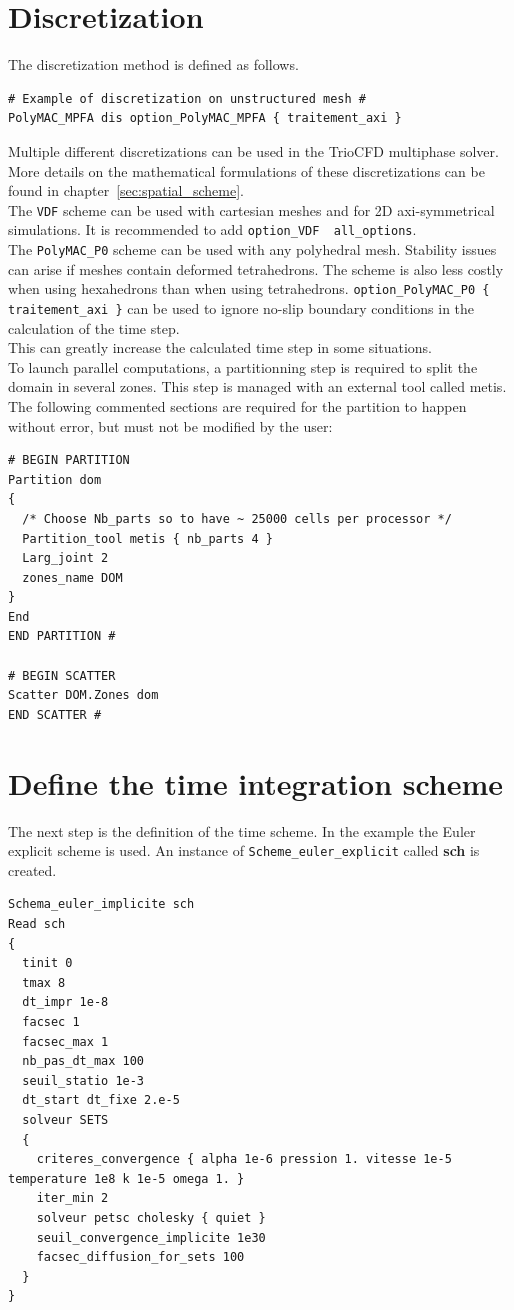 \section{Discretization}\label{data:discretisation}
The discretization method is defined as follows.
\begin{lstlisting}
# Example of discretization on unstructured mesh #
PolyMAC_MPFA dis option_PolyMAC_MPFA { traitement_axi }
\end{lstlisting}
Multiple different discretizations can be used in the TrioCFD multiphase solver.
More details on the mathematical formulations of these discretizations can be found in chapter~\ref{sec:spatial_scheme}.\\
The \texttt{VDF} scheme can be used with cartesian meshes and for 2D axi-symmetrical simulations. 
It is recommended to add \texttt{option\_VDF { all_options}}.\\
The \texttt{PolyMAC\_P0} scheme can be used with any polyhedral mesh.
Stability issues can arise if meshes contain deformed tetrahedrons. The scheme is also less costly when using hexahedrons than when using tetrahedrons.
\texttt{option\_PolyMAC\_P0 \{ traitement\_axi \}} can be used to ignore no-slip boundary conditions in the calculation of the time step. \\
This can greatly increase the calculated time step in some situations.\\
To launch parallel computations, a partitionning step is required to split the domain in several zones. 
This step is managed with an external tool called metis.\\
The following commented sections are required for the partition to happen without error, but must not be modified by the user:
\begin{lstlisting}
# BEGIN PARTITION
Partition dom
{
  /* Choose Nb_parts so to have ~ 25000 cells per processor */
  Partition_tool metis { nb_parts 4 }
  Larg_joint 2
  zones_name DOM
}
End
END PARTITION #

# BEGIN SCATTER
Scatter DOM.Zones dom
END SCATTER #
\end{lstlisting}

\section{Define the time integration scheme}\label{data:time}
The next step is the definition of the time scheme. In the example the Euler explicit scheme is used. An instance of \texttt{Scheme\_euler\_explicit} called \textbf{sch} is created. 
\begin{lstlisting}
Schema_euler_implicite sch
Read sch
{
  tinit 0
  tmax 8
  dt_impr 1e-8
  facsec 1
  facsec_max 1
  nb_pas_dt_max 100
  seuil_statio 1e-3
  dt_start dt_fixe 2.e-5
  solveur SETS
  {
    criteres_convergence { alpha 1e-6 pression 1. vitesse 1e-5 temperature 1e8 k 1e-5 omega 1. }
    iter_min 2
    solveur petsc cholesky { quiet }
    seuil_convergence_implicite 1e30
    facsec_diffusion_for_sets 100
  }
}
\end{lstlisting}


